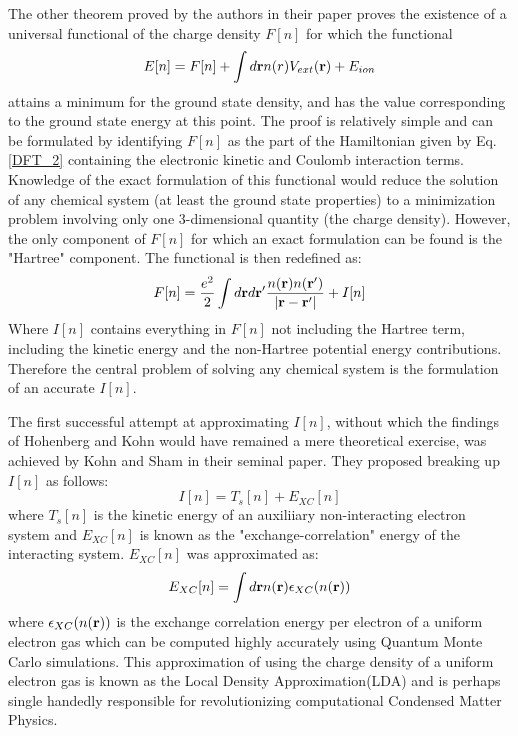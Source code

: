 \documentclass[10pt]{ruthesis}
\begin{document}
The other theorem proved by the authors in their paper proves the existence of   a universal functional of the charge density $F[n]$ for which the functional
\begin{equation}
E[n]=F[n] +\int d \mathbf{r} n(r) V_{ext}(\mathbf{r}) + E_{ion} 
\end{equation}
attains a minimum for the ground state density, and has the value corresponding to the ground state energy at this point. The proof is relatively simple and can be formulated by identifying $F[n]$ as the part of the Hamiltonian given by Eq. \ref{DFT_2} containing the electronic kinetic and Coulomb interaction terms. Knowledge of the exact formulation of this functional would reduce the solution of any chemical system (at least the ground state properties) to a minimization problem involving only one 3-dimensional quantity (the charge density). However, the only component of $F[n]$ for which an exact formulation can be found is the "Hartree" component. The functional is then redefined as:
\begin{equation}
 F[n]= \dfrac{e^2}{2}\int d\mathbf{r} d\mathbf{r}' \dfrac{n(\mathbf{r}) n(\mathbf{r}')}{|\mathbf{r}-\mathbf{r}'|} + I[n]
 \end{equation} 
Where $I[n]$ contains everything in $F[n]$ not including the Hartree term, including the kinetic energy and the non-Hartree potential energy contributions. Therefore the central problem of solving any chemical system is the formulation of an accurate $I[n]$.

The first successful attempt at approximating $I[n]$, without which the findings of Hohenberg and Kohn would have remained a mere theoretical exercise, was achieved by Kohn and Sham \cite{Kohn_Sham} in their seminal paper. They proposed breaking up $I[n]$ as follows:
\begin{equation}
 I[n]=T_s[n]+E_{XC}[n]
 \end{equation} 
where $T_s[n]$ is the kinetic energy of an auxiliiary non-interacting electron system and $E_{XC}[n]$ is known as the "exchange-correlation" energy of the interacting system. $E_{XC}[n]$ was approximated as:
\begin{equation}
E_{XC}[n]=\int d\mathbf{r} n(\mathbf{r}) \epsilon_{XC}(n(\mathbf{r}))
\end{equation}
 where $\epsilon_{XC}(n(\mathbf{r}))$ is the exchange correlation energy per electron of a uniform electron gas which can be computed highly accurately using Quantum Monte Carlo simulations. This approximation of using the charge density of a uniform electron gas is known as the Local Density Approximation(LDA) and is perhaps single handedly responsible for revolutionizing computational Condensed  Matter Physics. 
\end{document}
